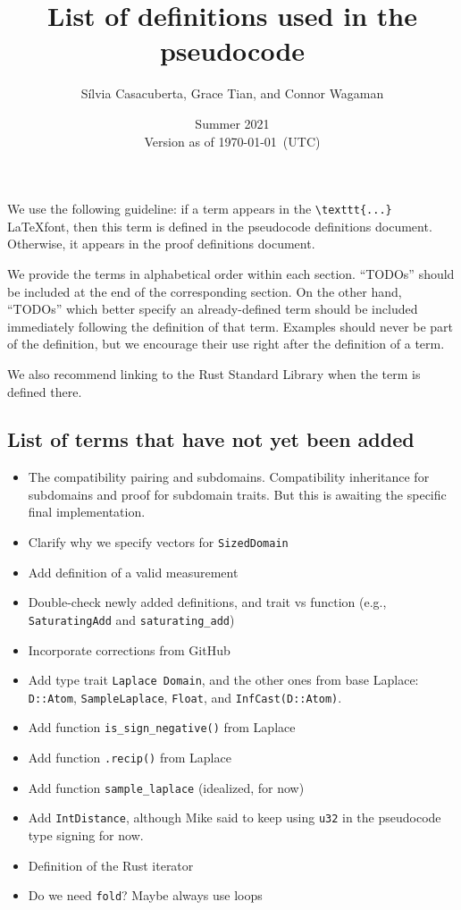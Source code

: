 \documentclass[11pt,a4paper]{article}
\title{List of definitions used in the pseudocode}
\author{S\'ilvia Casacuberta, Grace Tian, and Connor Wagaman}
\date{Summer 2021 \\ Version as of \today~(UTC)}
\theoremstyle{definition}
\begin{document}
\maketitle

We use the following guideline: if a term appears in the \texttt{\textbackslash\texttt{texttt\{...\}}} \LaTeX font, then this term is defined in the pseudocode definitions document. Otherwise, it appears in the proof definitions document. 

We provide the terms in alphabetical order within each section. ``TODOs'' should be included at the end of the corresponding section. On the other hand, ``TODOs'' which better specify an already-defined term should be included immediately following the definition of that term. Examples should never be part of the definition, but we encourage their use right after the definition of a term.

We also recommend linking to the Rust Standard Library when the term is defined there.

\tableofcontents

\subsection{List of terms that have not yet been added}
\begin{itemize}
    \item The compatibility pairing and subdomains. Compatibility inheritance for subdomains and proof for subdomain traits. But this is awaiting the specific final implementation.
    \item Clarify why we specify vectors for \texttt{SizedDomain}
    \item Add definition of a valid measurement
    \item Double-check newly added definitions, and trait vs function (e.g., \texttt{SaturatingAdd} and \texttt{saturating\_add})
    \item Incorporate corrections from GitHub
    \item Add type trait \texttt{Laplace Domain}, and the other ones from base Laplace: \texttt{D::Atom}, \texttt{SampleLaplace}, \texttt{Float}, and \texttt{InfCast(D::Atom)}.
    \item Add function \texttt{is\_sign\_negative()} from Laplace
    \item Add function \texttt{.recip()} from Laplace
    \item Add function \texttt{sample\_laplace} (idealized, for now)
    \item Add \texttt{IntDistance}, although Mike said to keep using \texttt{u32} in the pseudocode type signing for now.
    \item Definition of the Rust iterator
    \item Do we need \texttt{fold}? Maybe always use loops
\end{itemize}
\end{document}
